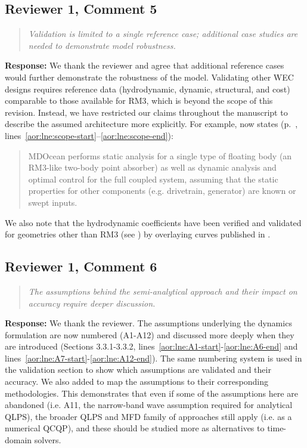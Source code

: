 \documentclass[11pt]{article}
\newcommand{\rcomment}[2]{\subsection*{#1}\begin{quote}\itshape #2\end{quote}}
\newcommand{\response}{\noindent\textbf{Response:} }
\begin{document}
\rcomment{Reviewer 1, Comment 5}{Validation is limited to a single reference case; additional case studies are needed to demonstrate model robustness.}
\response We thank the reviewer and agree that additional reference cases would further demonstrate the robustness of the model.
Validating other WEC designs requires reference data (hydrodynamic, dynamic, structural, and cost) comparable to those available for RM3, which is beyond the scope of this revision.
Instead, we have restricted our claims throughout the manuscript to describe the assumed architecture more explicitly.
For example,  now states (p.~\pageref{aor:lne:scope-start}, lines~\ref{aor:lne:scope-start}--\ref{aor:lne:scope-end}):
\begin{quote}
  MDOcean performs static analysis for a single type of floating body (an RM3-like two-body point absorber)
  as well as dynamic analysis and optimal control for the full coupled system,
  assuming that the static properties for other components (e.g. drivetrain, generator) are known or swept inputs.
\end{quote}
We also note that the hydrodynamic coefficients have been verified and validated for geometries other than RM3 (see ) by overlaying curves published in \citet{aor:chau_inertia_2012,aor:olaya_hydrodynamic_2015}.

\rcomment{Reviewer 1, Comment 6}{The assumptions behind the semi-analytical approach and their impact on accuracy require deeper discussion.}
\response We thank the reviewer. The assumptions underlying the dynamics formulation are now numbered (A1-A12) and discussed more deeply when they are introduced (Sections 3.3.1-3.3.2, lines~\ref{aor:lne:A1-start}-\ref{aor:lne:A6-end} and lines~\ref{aor:lne:A7-start}-\ref{aor:lne:A12-end}).
The same numbering system is used in the validation section to show which assumptions are validated and their accuracy.
We also added  to map the assumptions to their corresponding methodologies.
This demonstrates that even if some of the assumptions here are abandoned (i.e. A11, the narrow-band wave assumption required for analytical QLPS), the broader QLPS and MFD family of approaches still apply (i.e. as a numerical QCQP), and these should be studied more as alternatives to time-domain solvers.
\end{document}
